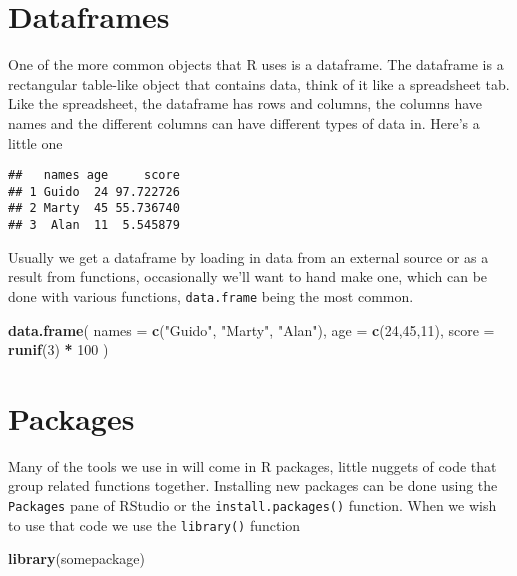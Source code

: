 \documentclass[
]{book}
\newenvironment{Shaded}{\begin{snugshade}}{\end{snugshade}}
\newcommand{\DataTypeTok}[1]{\textcolor[rgb]{0.13,0.29,0.53}{#1}}
\newcommand{\DecValTok}[1]{\textcolor[rgb]{0.00,0.00,0.81}{#1}}
\newcommand{\KeywordTok}[1]{\textcolor[rgb]{0.13,0.29,0.53}{\textbf{#1}}}
\newcommand{\NormalTok}[1]{#1}
\newcommand{\OperatorTok}[1]{\textcolor[rgb]{0.81,0.36,0.00}{\textbf{#1}}}
\newcommand{\StringTok}[1]{\textcolor[rgb]{0.31,0.60,0.02}{#1}}
\begin{document}
\hypertarget{dataframes}{%
\section{Dataframes}\label{dataframes}}

One of the more common objects that R uses is a dataframe. The dataframe is a rectangular table-like object that contains data, think of it like a spreadsheet tab. Like the spreadsheet, the dataframe has rows and columns, the columns have names and the different columns can have different types of data in. Here's a little one

\begin{verbatim}
##   names age     score
## 1 Guido  24 97.722726
## 2 Marty  45 55.736740
## 3  Alan  11  5.545879
\end{verbatim}

Usually we get a dataframe by loading in data from an external source or as a result from functions, occasionally we'll want to hand make one, which can be done with various functions, \texttt{data.frame} being the most common.

\begin{Shaded}
\begin{Highlighting}[]
\KeywordTok{data.frame}\NormalTok{(}
  \DataTypeTok{names =} \KeywordTok{c}\NormalTok{(}\StringTok{"Guido"}\NormalTok{, }\StringTok{"Marty"}\NormalTok{, }\StringTok{"Alan"}\NormalTok{),}
  \DataTypeTok{age =} \KeywordTok{c}\NormalTok{(}\DecValTok{24}\NormalTok{,}\DecValTok{45}\NormalTok{,}\DecValTok{11}\NormalTok{),}
  \DataTypeTok{score =} \KeywordTok{runif}\NormalTok{(}\DecValTok{3}\NormalTok{) }\OperatorTok{*}\StringTok{ }\DecValTok{100}
\NormalTok{)}
\end{Highlighting}
\end{Shaded}

\hypertarget{packages}{%
\section{Packages}\label{packages}}

Many of the tools we use in will come in R packages, little nuggets of code that group related functions together. Installing new packages can be done using the \texttt{Packages} pane of RStudio or the \texttt{install.packages()} function. When we wish to use that code we use the \texttt{library()} function

\begin{Shaded}
\begin{Highlighting}[]
\KeywordTok{library}\NormalTok{(somepackage)}
\end{Highlighting}
\end{Shaded}
\end{document}
